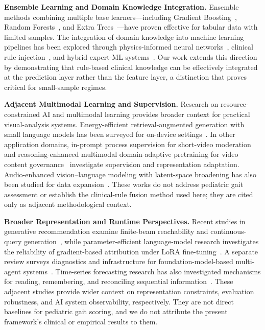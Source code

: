 \noindent\textbf{Ensemble Learning and Domain Knowledge Integration.}
Ensemble methods combining multiple base learners---including Gradient Boosting~\cite{friedman2001greedy}, Random Forests~\cite{breiman2001random}, and Extra Trees~\cite{geurts2006extremely}---have proven effective for tabular data with limited samples. The integration of domain knowledge into machine learning pipelines has been explored through physics-informed neural networks~\cite{raissi2019physics}, clinical rule injection~\cite{rudin2019stop}, and hybrid expert-ML systems~\cite{rajkomar2019machine}. Our work extends this direction by demonstrating that rule-based clinical knowledge can be effectively integrated at the prediction layer rather than the feature layer, a distinction that proves critical for small-sample regimes.


\noindent\textbf{Adjacent Multimodal Learning and Supervision.}
Research on resource-constrained AI and multimodal learning provides broader context for practical visual-analysis systems. Energy-efficient retrieval-augmented generation with small language models has been surveyed for on-device settings~\cite{cheng2026toward}. In other application domains, in-prompt process supervision for short-video moderation~\cite{liu-etal-2026-ips} and reasoning-enhanced multimodal domain-adaptive pretraining for video content governance~\cite{wang-etal-2025-reasoning-enhanced} investigate supervision and representation adaptation. Audio-enhanced vision--language modeling with latent-space broadening has also been studied for data expansion~\cite{10.1145/3711896.3737195}. These works do not address pediatric gait assessment or establish the clinical-rule fusion method used here; they are cited only as adjacent methodological context.


\noindent\textbf{Broader Representation and Runtime Perspectives.}
Recent studies in generative recommendation examine finite-beam reachability and continuous-query generation~\cite{sun2026semanticidsfinitebeamreachability}, while parameter-efficient language-model research investigates the reliability of gradient-based attribution under LoRA fine-tuning~\cite{sun2026staticgradientattributionunderperforms}. A separate review surveys diagnostics and infrastructure for foundation-model-based multi-agent systems~\cite{sun2026diagnosticsinfrastructure}. Time-series forecasting research has also investigated mechanisms for reading, remembering, and reconciling sequential information~\cite{guan2026timbreteachingtimeseries}. These adjacent studies provide wider context on representation constraints, evaluation robustness, and AI system observability, respectively. They are not direct baselines for pediatric gait scoring, and we do not attribute the present framework's clinical or empirical results to them.
